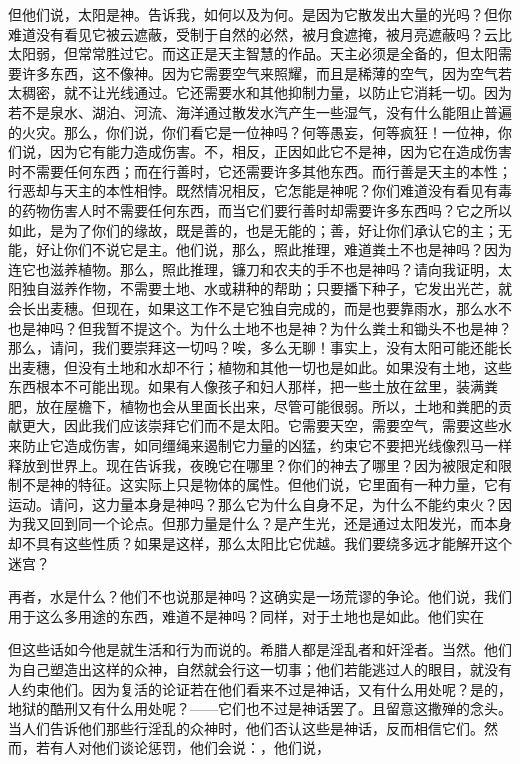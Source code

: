 但他们说，太阳是神。告诉我，如何以及为何。是因为它散发出大量的光吗？但你难道没有看见它被云遮蔽，受制于自然的必然，被月食遮掩，被月亮遮蔽吗？云比太阳弱，但常常胜过它。而这正是天主智慧的作品。天主必须是全备的，但太阳需要许多东西，这不像神。因为它需要空气来照耀，而且是稀薄的空气，因为空气若太稠密，就不让光线通过。它还需要水和其他抑制力量，以防止它消耗一切。因为若不是泉水、湖泊、河流、海洋通过散发水汽产生一些湿气，没有什么能阻止普遍的火灾。那么，你们说，你们看它是一位神吗？何等愚妄，何等疯狂！一位神，你们说，因为它有能力造成伤害。不，相反，正因如此它不是神，因为它在造成伤害时不需要任何东西；而在行善时，它还需要许多其他东西。而行善是天主的本性；行恶却与天主的本性相悖。既然情况相反，它怎能是神呢？你们难道没有看见有毒的药物伤害人时不需要任何东西，而当它们要行善时却需要许多东西吗？它之所以如此，是为了你们的缘故，既是善的，也是无能的；善，好让你们承认它的主；无能，好让你们不说它是主。他们说，那么，照此推理，难道粪土不也是神吗？因为连它也滋养植物。那么，照此推理，镰刀和农夫的手不也是神吗？请向我证明，太阳独自滋养作物，不需要土地、水或耕种的帮助；只要播下种子，它发出光芒，就会长出麦穗。但现在，如果这工作不是它独自完成的，而是也要靠雨水，那么水不也是神吗？但我暂不提这个。为什么土地不也是神？为什么粪土和锄头不也是神？那么，请问，我们要崇拜这一切吗？唉，多么无聊！事实上，没有太阳可能还能长出麦穗，但没有土地和水却不行；植物和其他一切也是如此。如果没有土地，这些东西根本不可能出现。如果有人像孩子和妇人那样，把一些土放在盆里，装满粪肥，放在屋檐下，植物也会从里面长出来，尽管可能很弱。所以，土地和粪肥的贡献更大，因此我们应该崇拜它们而不是太阳。它需要天空，需要空气，需要这些水来防止它造成伤害，如同缰绳来遏制它力量的凶猛，约束它不要把光线像烈马一样释放到世界上。现在告诉我，夜晚它在哪里？你们的神去了哪里？因为被限定和限制不是神的特征。这实际上只是物体的属性。但他们说，它里面有一种力量，它有运动。请问，这力量本身是神吗？那么它为什么自身不足，为什么不能约束火？因为我又回到同一个论点。但那力量是什么？是产生光，还是通过太阳发光，而本身却不具有这些性质？如果是这样，那么太阳比它优越。我们要绕多远才能解开这个迷宫？\par

再者，水是什么？他们不也说那是神吗？这确实是一场荒谬的争论。他们说，我们用于这么多用途的东西，难道不是神吗？同样，对于土地也是如此。他们实在\par

但这些话如今他是就生活和行为而说的。希腊人都是淫乱者和奸淫者。当然。他们为自己塑造出这样的众神，自然就会行这一切事；他们若能逃过人的眼目，就没有人约束他们。因为复活的论证若在他们看来不过是神话，又有什么用处呢？是的，地狱的酷刑又有什么用处呢？——它们也不过是神话罢了。且留意这撒殚的念头。当人们告诉他们那些行淫乱的众神时，他们否认这些是神话，反而相信它们。然而，若有人对他们谈论惩罚，他们会说：，他们说，\par

